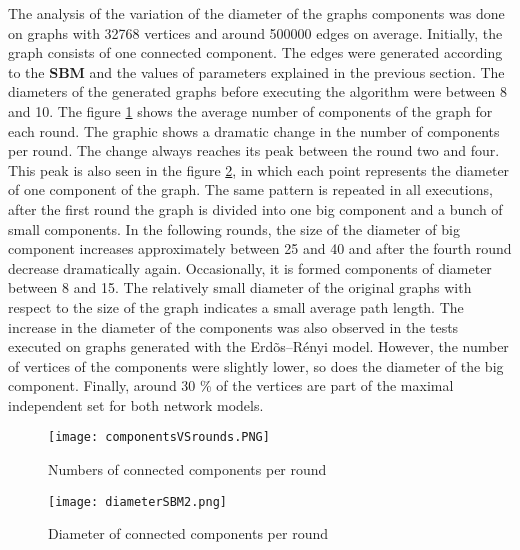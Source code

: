The analysis of the variation of the diameter of the graphs components was done on graphs with 32768 vertices and around 500000 edges on average. Initially, the graph consists of one connected component. The edges were generated according to the \textbf{SBM} and the values of parameters explained in the previous section. The diameters of the generated graphs before executing the algorithm were between 8 and 10. The figure \ref{fig:components_rounds} shows the average number of components of the graph for each round. The graphic shows a dramatic change in the number of components per round. The change always reaches its peak between the round two and four. This peak is also seen in the figure \ref{fig:diameter}, in which each point represents the diameter of one component of the graph. The same pattern is repeated in all executions, after the first round the graph is divided into one big component and a bunch of small components. In the following rounds, the size of the diameter of big component increases approximately between 25 and 40 and after the fourth round decrease dramatically again. Occasionally, it is formed components of diameter between 8 and 15. The relatively small diameter of the original graphs with respect to the size of the graph indicates a small average path length.  The increase in the diameter of the components was also observed in the tests executed on graphs generated with the Erd\~os--R\'enyi model. However, the number of vertices of the components were slightly lower, so does the diameter of the big component. Finally, around 30 \% of the vertices are part of the maximal independent set for both network models.  


\begin{figure}[ht]
\centering
\texttt{[image: componentsVSrounds.PNG]} 
\caption{Numbers of connected components per round}
\label{fig:components_rounds}
\end{figure}


\begin{figure}[htb]
\centering
\texttt{[image: diameterSBM2.png]} 
\caption{Diameter of connected components per round}
\label{fig:diameter}
\end{figure}


